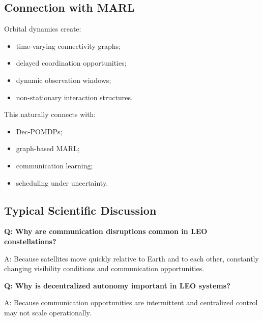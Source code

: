 \documentclass[10pt,a4paper,twocolumn]{article}
\begin{document}
\subsection{Connection with MARL}

Orbital dynamics create:
\begin{itemize}
    \item time-varying connectivity graphs;
    \item delayed coordination opportunities;
    \item dynamic observation windows;
    \item non-stationary interaction structures.
\end{itemize}

This naturally connects with:
\begin{itemize}
    \item Dec-POMDPs;
    \item graph-based MARL;
    \item communication learning;
    \item scheduling under uncertainty.
\end{itemize}


\subsection{Typical Scientific Discussion}

\begin{questionbox}
    \textbf{Q: Why are communication disruptions common in LEO constellations?}

    A: Because satellites move quickly relative to Earth and to each other, constantly changing visibility conditions and communication opportunities.
\end{questionbox}

\begin{questionbox}
    \textbf{Q: Why is decentralized autonomy important in LEO systems?}

    A: Because communication opportunities are intermittent and centralized control may not scale operationally.
\end{questionbox}


\end{document}

